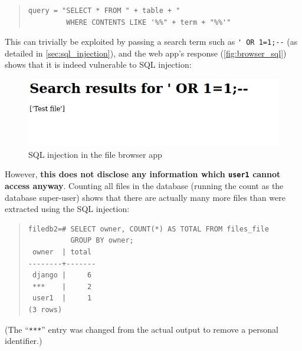 \documentclass[12pt]{report}
\begin{document}
\begin{quote}
\begin{samepage}
\begin{verbatim}
query = "SELECT * FROM " + table + "
         WHERE CONTENTS LIKE '%%" + term + "%%'"
\end{verbatim}
\end{samepage}
\end{quote}

This can trivially be exploited by passing a search term such as \verb+' OR 1=1;--+ (as detailed in \autoref{sec:sql_injection}), and the web app's response (\autoref{fig:browser_sql}) shows that it is indeed vulnerable to SQL injection:

\begin{figure}[h]
  \begin{center}
    \includegraphics[scale=0.5]{08-browser4-sql.png}
  \end{center}
  \caption{SQL injection in the file browser app}
  \label{fig:browser_sql}
\end{figure}

However, \textbf{this does not disclose any information which \texttt{user1} cannot access anyway}. Counting all files in the database (running the count as the database super-user) shows that there are actually many more files than were extracted using the SQL injection:

\begin{quote}
\begin{samepage}
\begin{verbatim}
filedb2=# SELECT owner, COUNT(*) AS TOTAL FROM files_file
          GROUP BY owner;
 owner  | total
--------+-------
 django |     6
 ***    |     2
 user1  |     1
(3 rows)
\end{verbatim}
\end{samepage}
\end{quote}

(The ``\verb+***+'' entry was changed from the actual output to remove a personal identifier.)

\end{document}
